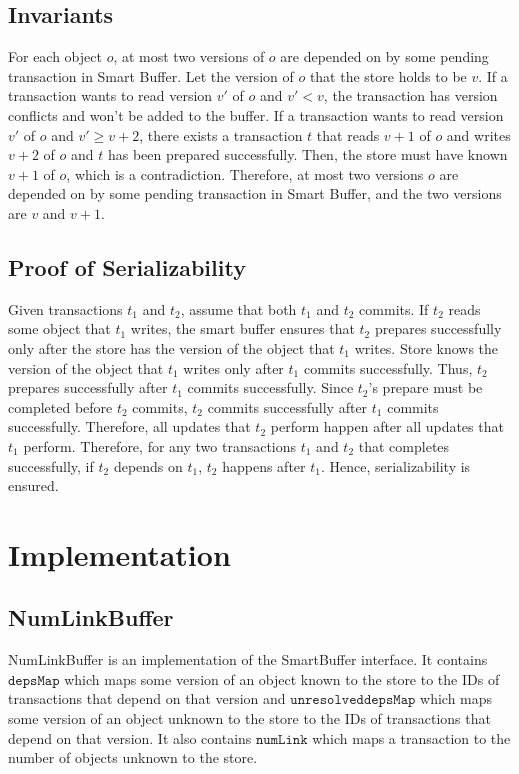 \documentclass{article}
\begin{document}
\subsection{Invariants}
\label{sec:inv}
For each object $o$, at most two versions of $o$ are depended on by some pending
transaction in Smart Buffer. Let the version of $o$ that the store holds to be $v$. 
If a transaction wants to read version $v'$ of $o$ and $v' < v$, the transaction 
has version conflicts and won't be added to the buffer. If a transaction wants to
read version $v'$ of $o$ and $v' \geq v + 2$, there exists a transaction $t$ that 
reads $v + 1$ of $o$ and writes $v + 2$ of $o$ and $t$ has been prepared successfully.
Then, the store must have known $v + 1$ of $o$, which is a contradiction. Therefore,
at most two versions $o$ are depended on by some pending transaction in Smart Buffer,
and the two versions are $v$ and $v + 1$.

\subsection{Proof of Serializability}
Given transactions $t_1$ and $t_2$, assume that both $t_1$ and $t_2$ commits. If $t_2$
reads some object that $t_1$ writes, the smart buffer ensures that $t_2$ prepares 
successfully only after the store has the version of the object that $t_1$ writes. 
Store knows the version of the object that $t_1$ writes only after $t_1$ commits successfully.
Thus, $t_2$ prepares successfully after $t_1$ commits successfully. Since $t_2$'s prepare
must be completed before $t_2$ commits, $t_2$ commits successfully after $t_1$ commits
successfully. Therefore, all updates that $t_2$ perform happen after all updates that $t_1$ perform.
Therefore, for any two transactions $t_1$ and $t_2$ that completes successfully, if $t_2$
depends on $t_1$, $t_2$ happens after $t_1$. Hence, serializability is ensured.

\section{Implementation}
\label{sec:implementation}
\subsection{NumLinkBuffer}
NumLinkBuffer is an implementation of the SmartBuffer interface. It contains
$\mathtt{depsMap}$ which maps some version of an object known to the store 
to the IDs of transactions that depend on that version and $\mathtt{unresolveddepsMap}$ 
which maps some version of an object unknown to the store to the IDs of
transactions that depend on that version. It also contains $\mathtt{numLink}$
which maps a transaction to the number of objects unknown to the store. 
\end{document}
